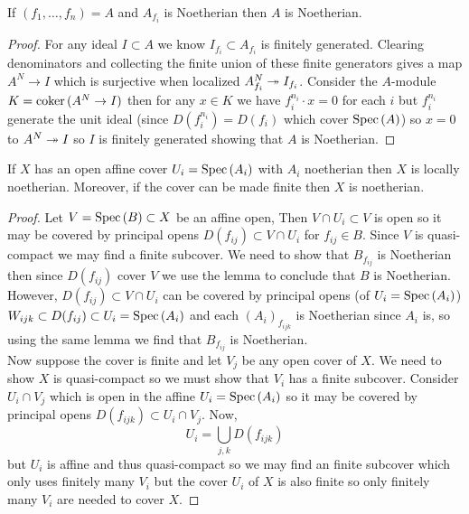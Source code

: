 \documentclass[12pt]{article}
\begin{document}
\begin{lemma}
If $(f_1, \dots, f_n) = A$ and $A_{f_i}$ is Noetherian then $A$ is Noetherian.
\end{lemma}

\begin{proof}
For any ideal $I \subset A$ we know $I_{f_i} \subset A_{f_i}$ is finitely generated. Clearing denominators and collecting the finite union of these finite generators gives a map $A^N \to I$ which is surjective when localized $A^N_{f_i} \twoheadrightarrow I_{f_i}$. Consider the $A$-module $K = \operatorname{\mathrm{coker}}{(A^N \to I)}$ then for any $x \in K$ we have $f_i^{n_i} \cdot x = 0$ for each $i$ but $f_i^{n_i}$ generate the unit ideal (since $D(f_i^{n_i}) = D(f_i)$ which cover $\mathrm{Spec}\left( A \right)$) so $x = 0$ to $A^N \twoheadrightarrow I$ so $I$ is finitely generated showing that $A$ is Noetherian.
\end{proof}

\begin{lemma}
If $X$ has an open affine cover $U_i = \mathrm{Spec}\left( A_i \right)$ with $A_i$ noetherian then $X$ is locally noetherian. Moreover, if the cover can be made finite then $X$ is noetherian. 
\end{lemma}

\begin{proof}
Let $V = \mathrm{Spec}\left( B \right) \subset X$ be an affine open, Then $V \cap U_i \subset V$ is open so it may be covered by principal opens $D(f_{ij}) \subset V \cap U_i$ for $f_{ij} \in B$. Since $V$ is quasi-compact we may find a finite subcover. We need to show that $B_{f_{ij}}$ is Noetherian then since $D(f_{ij})$ cover $V$ we use the lemma to conclude that $B$ is Noetherian. However, $D(f_{ij}) \subset V \cap U_i$ can be covered by principal opens (of $U_i = \mathrm{Spec}\left( A_i \right)$) $W_{ijk} \subset D(f_{ij}) \subset U_i = \mathrm{Spec}\left( A_i \right)$ and each $(A_i)_{f_{ijk}}$ is Noetherian since $A_i$ is, so using the same lemma we find that $B_{f_{ij}}$ is Noetherian. 
\bigskip\\
Now suppose the cover is finite and let $V_j$ be any open cover of $X$. We need to show $X$ is quasi-compact so we must show that $V_i$ has a finite subcover. Consider $U_i \cap V_j$  which is open in the affine $U_i = \mathrm{Spec}\left( A_i \right)$ so it may be covered by principal opens $D(f_{ijk}) \subset U_i \cap V_j$. Now,
\[ U_i = \bigcup_{j,k} D(f_{ijk}) \]
but $U_i$ is affine and thus quasi-compact so we may find an finite subcover which only uses finitely many $V_i$ but the cover $U_i$ of $X$ is also finite so only finitely many $V_i$ are needed to cover $X$.  
\end{proof}
\end{document}
